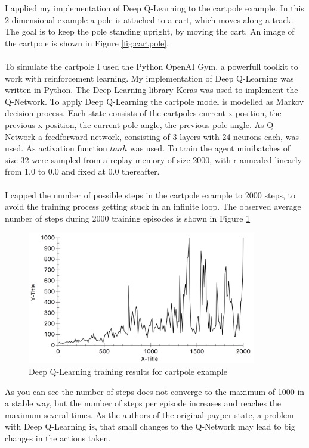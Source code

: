 I applied my implementation of Deep Q-Learning to the cartpole example. In this 2 dimensional example a pole is attached to a cart, which moves along a track. The goal is to keep the pole standing upright, by moving the cart. An image of the cartpole is shown in Figure \ref{fig:cartpole}.
\\
\\
To simulate the cartpole I used the Python OpenAI Gym, a powerfull toolkit to work with reinforcement learning. My implementation of Deep Q-Learning was written in Python. The Deep Learning library Keras was used to implement the Q-Network. To apply Deep Q-Learning the cartpole model is modelled as Markov decision process. Each state consists of the cartpoles current x position, the previous x position, the current pole angle, the previous pole angle. As Q-Network a feedforward network, consisting of 3 layers with 24 neurons each, was used. As activation function $tanh$ was used. To train the agent minibatches of size 32 were sampled from a replay memory of size 2000, with $\epsilon$ annealed linearly from 1.0 to 0.0 and fixed at 0.0 thereafter. 
\\
\\
I capped the number of possible steps in the cartpole example to 2000 steps, to avoid the training process getting stuck in an infinite loop. The observed average number of steps during 2000 training episodes is shown in Figure \ref{fig:cartpole_result}
\\
\begin{figure}
	\centering
	\includegraphics[width=10cm]{results-cartpole-avg10-2017steps.png}
	\caption{Deep Q-Learning training results for cartpole example}
	\label{fig:cartpole_result}
\end{figure}

As you can see the number of steps does not converge to the maximum of 1000 in a stable way, but the number of steps per episode increases and reaches the maximum several times. As the authors of the original payper state, a problem with Deep Q-Learning is, that small changes to the Q-Network may lead to big changes in the actions taken. 

